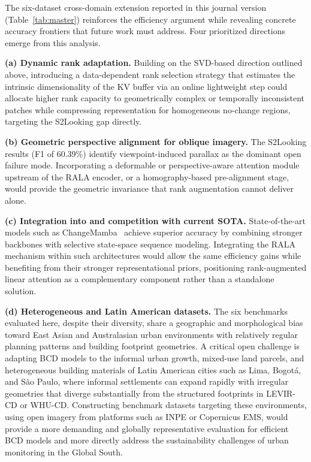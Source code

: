 \documentclass[runningheads]{llncs}
\newcommand{\journal}[1]{{\color{orange}#1}}
\begin{document}
\journal{%
The six-dataset cross-domain extension reported in this journal version
(Table~\ref{tab:master}) reinforces the efficiency argument while revealing
concrete accuracy frontiers that future work must address. Four prioritized
directions emerge from this analysis.

\noindent\textbf{(a) Dynamic rank adaptation.}
Building on the SVD-based direction outlined above, introducing a
data-dependent rank selection strategy that estimates the intrinsic
dimensionality of the KV buffer via an online lightweight step could allocate higher rank
capacity to geometrically complex or temporally inconsistent patches while
compressing representation for homogeneous no-change regions, targeting the
S2Looking gap directly.

\noindent\textbf{(b) Geometric perspective alignment for oblique imagery.}
The S2Looking results (F1 of 60.39\%) identify viewpoint-induced parallax as
the dominant open failure mode. Incorporating a deformable or
perspective-aware attention module upstream of the RALA encoder, or a
homography-based pre-alignment stage, would provide the geometric invariance
that rank augmentation cannot deliver alone.

\noindent\textbf{(c) Integration into and competition with current SOTA.}
State-of-the-art models such as ChangeMamba~\cite{Chen2024ChangeMamba} achieve
superior accuracy by combining stronger backbones with selective state-space
sequence modeling. Integrating the RALA mechanism within such architectures
would allow the same efficiency gains while benefiting from their stronger
representational priors, positioning rank-augmented linear attention as a
complementary component rather than a standalone solution.

\noindent\textbf{(d) Heterogeneous and Latin American datasets.}
The six benchmarks evaluated here, despite their diversity, share a geographic
and morphological bias toward East Asian and Australasian urban environments
with relatively regular planning patterns and building footprint geometries.
A critical open challenge is adapting BCD models to the informal urban growth,
mixed-use land parcels, and heterogeneous building materials of Latin American
cities such as Lima, Bogotá, and São Paulo, where informal settlements can
expand rapidly with irregular geometries that diverge substantially from the
structured footprints in LEVIR-CD or WHU-CD. Constructing benchmark datasets
targeting these environments, using open imagery from platforms such as INPE
or Copernicus EMS, would provide a more demanding and globally representative
evaluation for efficient BCD models and more directly address the sustainability
challenges of urban monitoring in the Global South.%
}
\end{document}
